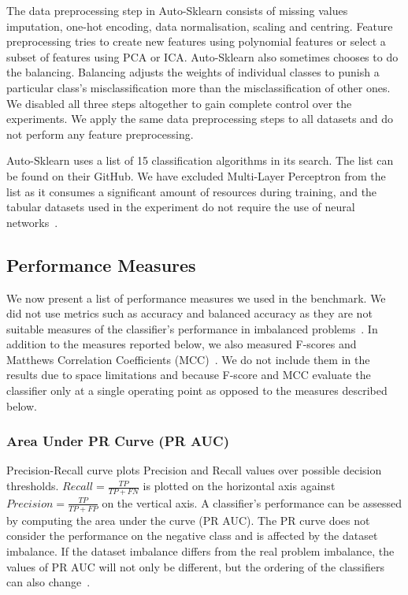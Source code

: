 \documentclass[conference]{IEEEtran}
\begin{document}
The data preprocessing step in Auto-Sklearn consists of missing values imputation, one-hot
encoding, data normalisation, scaling and centring. Feature preprocessing tries to create new
features using polynomial features or select a subset of features using PCA or ICA. Auto-Sklearn
also sometimes chooses to do the balancing. Balancing adjusts the weights of individual classes to
punish a particular class's misclassification more than the misclassification of other ones. We
disabled all three steps altogether to gain complete control over the experiments. We apply the
same data preprocessing steps to all datasets and do not perform any feature preprocessing.

Auto-Sklearn uses a list of 15 classification algorithms in its search. The list can be found on
their GitHub. We have excluded Multi-Layer Perceptron from the list as it consumes a significant
amount of resources during training, and the tabular datasets used in the experiment do not require
the use of neural networks~\cite{nn-for-tabular-data}.


\subsection{Performance Measures}

We now present a list of performance measures we used in the benchmark. We did not use metrics such
as accuracy and balanced accuracy as they are not suitable measures of the classifier's performance
in imbalanced problems~\cite{brabec2018}. In addition to the measures reported below, we also
measured F-scores and Matthews Correlation Coefficients (MCC)~\cite{matthews1975}. We do not
include them in the results due to space limitations and because F-score and MCC evaluate the
classifier only at a single operating point as opposed to the measures described below.


\subsubsection{Area Under PR Curve (PR AUC)}

Precision-Recall curve plots Precision and Recall values over possible decision thresholds. $Recall
= \frac{TP}{TP + FN}$ is plotted on the horizontal axis against $Precision = \frac{TP}{TP + FP}$ on
the vertical axis. A classifier's performance can be assessed by computing the area under the curve
(PR AUC). The PR curve does not consider the performance on the negative class and is affected by
the dataset imbalance. If the dataset imbalance differs from the real problem imbalance, the values
of PR AUC will not only be different, but the ordering of the classifiers can also
change~\cite{brabec2020}.
\end{document}
